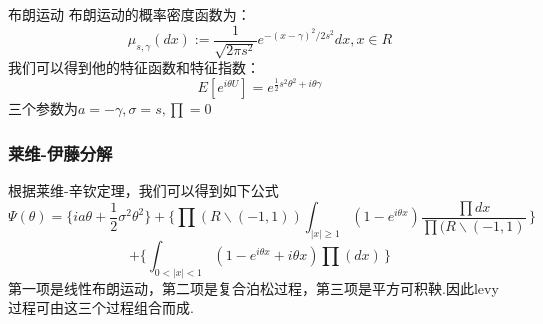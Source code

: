 \begin{frame}
布朗运动\newline\newline
布朗运动的概率密度函数为：\[\mu_{s,\gamma}(dx):=\frac{1}{\sqrt{2\pi s^{2}}}e^{-(x-\gamma)^{2}/2s^{2}}dx ,x \in R\]我们可以得到他的特征函数和特征指数：\[E[e^{i\theta U}]=e^{\frac{1}{2}s^{2}\theta^{2}+i\theta\gamma}\]三个参数为$a=-\gamma,\sigma=s,\prod=0$

\end{frame}

\begin{frame}
\frametitle{莱维-伊藤分解}


根据莱维-辛钦定理，我们可以得到如下公式\[\Psi(\theta)=\{ia\theta+\frac{1}{2}\sigma^{2}\theta^{2}\}+\{\prod(R\backslash(-1,1))\int_{|x|\geq1}(1-e^{i\theta x})\frac{\prod{dx}}{\prod(R\backslash(-1,1)} \,\}\]\newline\[+\{\int_{0<|x|<1}(1-e^{i\theta x}+i\theta x)\prod(dx) \,\} \]
第一项是线性布朗运动，第二项是复合泊松过程，第三项是平方可积鞅.因此levy过程可由这三个过程组合而成.

\end{frame}
